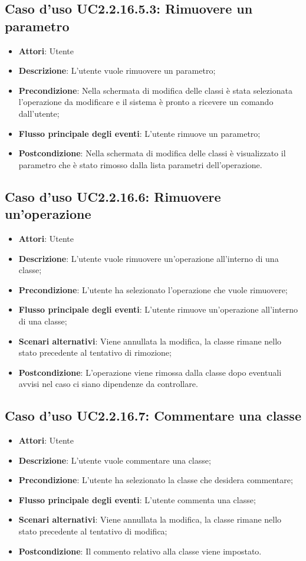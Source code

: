 \documentclass[../AnalisiDeiRequisiti.tex]{subfiles}
\begin{document}
			\subsection{Caso d'uso UC2.2.16.5.3: Rimuovere un parametro}
			\begin{itemize}
				\item \textbf{Attori}: Utente
				\item \textbf{Descrizione}: L'utente vuole rimuovere un parametro;
				\item \textbf{Precondizione}: Nella schermata di modifica delle classi è stata selezionata l'operazione da modificare e il sistema è pronto a ricevere un comando dall'utente;
				\item \textbf{Flusso principale degli eventi}: L'utente rimuove un parametro;
				\item \textbf{Postcondizione}: Nella schermata di modifica delle classi è visualizzato il parametro che è stato rimosso dalla lista parametri dell'operazione.
			\end{itemize}
			\subsection{Caso d'uso UC2.2.16.6: Rimuovere un'operazione}
			\begin{itemize}
				\item \textbf{Attori}: Utente
				\item \textbf{Descrizione}: L'utente vuole rimuovere un'operazione all'interno di una classe;
				\item \textbf{Precondizione}: L'utente ha selezionato l'operazione che vuole rimuovere;
				\item \textbf{Flusso principale degli eventi}: L'utente rimuove un'operazione all'interno di una classe;
				\item \textbf{Scenari alternativi}: Viene annullata la modifica, la classe rimane nello stato precedente al tentativo di rimozione;
				\item \textbf{Postcondizione}: L'operazione viene rimossa dalla classe dopo eventuali avvisi nel caso ci siano dipendenze da controllare.
			\end{itemize}
			\subsection{Caso d'uso UC2.2.16.7: Commentare una classe}
			\begin{itemize}
				\item \textbf{Attori}: Utente
				\item \textbf{Descrizione}: L'utente vuole commentare una classe;
				\item \textbf{Precondizione}: L'utente ha selezionato la classe che desidera commentare;
				\item \textbf{Flusso principale degli eventi}: L'utente commenta una classe;
				\item \textbf{Scenari alternativi}: Viene annullata la modifica, la classe rimane nello stato precedente al tentativo di modifica;
				\item \textbf{Postcondizione}: Il commento relativo alla classe viene impostato.
			\end{itemize}
\end{document}
